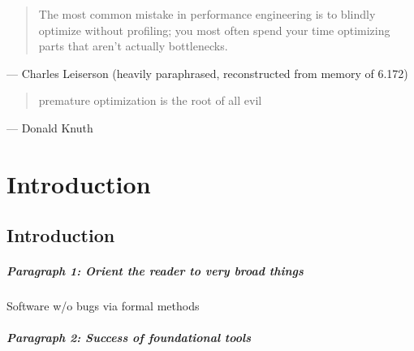 \begin{quote}
  The most common mistake in performance engineering is to blindly optimize without profiling; you most often spend your time optimizing parts that aren't actually bottlenecks.
\end{quote}
\begin{flushright}
  --- Charles Leiserson (heavily paraphrased, reconstructed from memory of 6.172)
\end{flushright}

\begin{quote}
  premature optimization is the root of all evil
\end{quote}
\begin{flushright}
  --- Donald Knuth
\end{flushright}

\chapter{Introduction}\label{ch:intro}

\section{Introduction}

\paragraph{Paragraph 1: Orient the reader to very broad things} Software w/o bugs via formal methods

\paragraph{Paragraph 2: Success of foundational tools}

